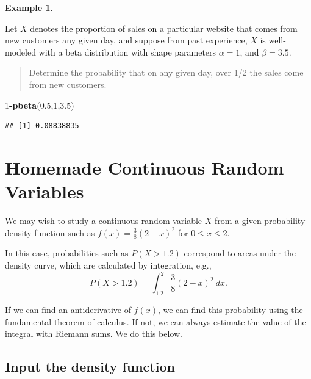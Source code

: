 \documentclass[
]{book}
\newenvironment{Shaded}{\begin{snugshade}}{\end{snugshade}}
\newcommand{\DecValTok}[1]{\textcolor[rgb]{0.00,0.00,0.81}{#1}}
\newcommand{\FloatTok}[1]{\textcolor[rgb]{0.00,0.00,0.81}{#1}}
\newcommand{\FunctionTok}[1]{\textcolor[rgb]{0.13,0.29,0.53}{\textbf{#1}}}
\newcommand{\NormalTok}[1]{#1}
\newcommand{\SpecialCharTok}[1]{\textcolor[rgb]{0.81,0.36,0.00}{\textbf{#1}}}
\theoremstyle{definition}
\theoremstyle{definition}
\newtheorem{example}{Example}[chapter]
\theoremstyle{definition}
\theoremstyle{definition}
\theoremstyle{remark}
\begin{document}
\begin{example}
\protect\hypertarget{exm:beta-sales-R}{}\label{exm:beta-sales-R}

Let \(X\) denotes the proportion of sales on a particular website that comes from new customers any given day, and suppose from past experience, \(X\) is well-modeled with a beta distribution with shape parameters \(\alpha = 1\), and \(\beta=3.5\).

\begin{quote}
Determine the probability that on any given day, over 1/2 the sales come from new customers.
\end{quote}

\begin{Shaded}
\begin{Highlighting}[]
\DecValTok{1}\SpecialCharTok{{-}}\FunctionTok{pbeta}\NormalTok{(}\FloatTok{0.5}\NormalTok{,}\DecValTok{1}\NormalTok{,}\FloatTok{3.5}\NormalTok{)}
\end{Highlighting}
\end{Shaded}

\begin{verbatim}
## [1] 0.08838835
\end{verbatim}

\end{example}

\section{Homemade Continuous Random Variables}\label{custom-continuous-R}

We may wish to study a continuous random variable \(X\) from a given probability density function such as \(f(x) = \frac{3}{8}(2-x)^2\) for \(0 \leq x \leq 2\).

In this case, probabilities such as \(P(X > 1.2)\) correspond to areas under the density curve, which are calculated by integration, e.g., \[P(X > 1.2) = \int_{1.2}^2 \frac{3}{8}(2-x)^2~dx.\]

If we can find an antiderivative of \(f(x)\), we can find this probability using the fundamental theorem of calculus. If not, we can always estimate the value of the integral with Riemann sums. We do this below.

\subsection*{Input the density function}\label{input-the-density-function}
\end{document}
